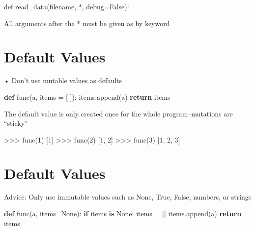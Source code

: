 \documentclass[
  letterpaper,
  DIV=11,
  numbers=noendperiod]{scrreprt}
\newenvironment{Shaded}{\begin{snugshade}}{\end{snugshade}}
\newcommand{\ControlFlowTok}[1]{\textcolor[rgb]{0.00,0.23,0.31}{\textbf{#1}}}
\newcommand{\DecValTok}[1]{\textcolor[rgb]{0.68,0.00,0.00}{#1}}
\newcommand{\FunctionTok}[1]{\textcolor[rgb]{0.28,0.35,0.67}{#1}}
\newcommand{\KeywordTok}[1]{\textcolor[rgb]{0.00,0.23,0.31}{\textbf{#1}}}
\newcommand{\NormalTok}[1]{\textcolor[rgb]{0.00,0.23,0.31}{#1}}
\newcommand{\OperatorTok}[1]{\textcolor[rgb]{0.37,0.37,0.37}{#1}}
\newcommand{\VariableTok}[1]{\textcolor[rgb]{0.07,0.07,0.07}{#1}}
\begin{document}
def read\_data(filename, *, debug=False):

All arguments after the * must be given as by keyword


\chapter{Default Values}\label{default-values}

• Don't use mutable values as defaults

\begin{Shaded}
\begin{Highlighting}[]
\KeywordTok{def}\NormalTok{ func(a, items }\OperatorTok{=}\NormalTok{ [ ]):}
\NormalTok{    items.append(a)}
    \ControlFlowTok{return}\NormalTok{ items }
\end{Highlighting}
\end{Shaded}

The default value is only created once for the whole program--mutations
are ``sticky''

\begin{Shaded}
\begin{Highlighting}[]
\OperatorTok{\textgreater{}\textgreater{}\textgreater{}} \FunctionTok{func(}\DecValTok{1}\FunctionTok{)}  
\FunctionTok{[}\DecValTok{1}\FunctionTok{]}  
\OperatorTok{\textgreater{}\textgreater{}\textgreater{}} \FunctionTok{func(}\DecValTok{2}\FunctionTok{)}  
\FunctionTok{[}\DecValTok{1}\FunctionTok{,} \DecValTok{2}\FunctionTok{]}  
\OperatorTok{\textgreater{}\textgreater{}\textgreater{}} \FunctionTok{func(}\DecValTok{3}\FunctionTok{)}  
\FunctionTok{[}\DecValTok{1}\FunctionTok{,} \DecValTok{2}\FunctionTok{,} \DecValTok{3}\FunctionTok{]} 
\end{Highlighting}
\end{Shaded}


\chapter{Default Values}\label{default-values-1}

Advice: Only use immutable values such as None, True, False, numbers, or
strings

\begin{Shaded}
\begin{Highlighting}[]
\KeywordTok{def}\NormalTok{ func(a, items}\OperatorTok{=}\VariableTok{None}\NormalTok{): }\ControlFlowTok{if}\NormalTok{ items }\KeywordTok{is} \VariableTok{None}\NormalTok{: items }\OperatorTok{=}\NormalTok{ [] items.append(a) }\ControlFlowTok{return}\NormalTok{ items }
\end{Highlighting}
\end{Shaded}
\end{document}
